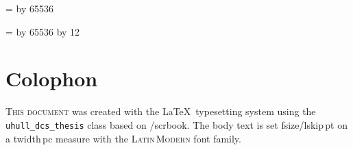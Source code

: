 
\def\value#1{\expandafter\number\csname #1\endcsname}
\def\tocount#1#2{#1=#2\divide #1 by 65536}

\newcount\fsize
{}

\newcount\lskip
\tocount\lskip\baselineskip

\newcount\twidth
\tocount\twidth\textwidth
\divide\twidth by 12

\chapter*{Colophon}
\label{ch:colophon}

\lettrine{T}{his document} was created with the \LaTeX\ typesetting system using the
\texttt{uhull\_dcs\_thesis} class based on {\KOMAScript}/scrbook. The body text is set
\value{fsize}/\value{lskip}\,pt on a \value{twidth}\,pc measure with the \textsc{Latin\,Modern} font
family.
\par

